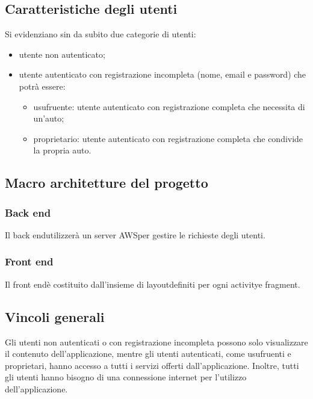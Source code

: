 \subsection{Caratteristiche degli utenti}
Si evidenziano sin da subito due categorie di utenti:
\begin{itemize}
	\item utente non autenticato;
	\item utente autenticato con registrazione incompleta (nome, email e password) che potrà essere:
		\begin{itemize}
			\item usufruente: utente autenticato con registrazione completa che necessita di un'auto;
			\item proprietario: utente autenticato con registrazione completa che condivide la propria auto.
		\end{itemize}
\end{itemize}

\subsection{Macro architetture del progetto}
\subsubsection{Back end}
Il back end\glosp utilizzerà un server AWS\glosp per gestire le richieste degli utenti.

\subsubsection{Front end}
Il front end\glosp è costituito dall'insieme di layout\glosp definiti per ogni activity\glosp e fragment\glo.

\subsection{Vincoli generali}
Gli utenti non autenticati o con registrazione incompleta possono solo visualizzare il contenuto dell'applicazione, mentre gli utenti autenticati, come usufruenti e proprietari, hanno accesso a tutti i servizi offerti dall'applicazione. Inoltre, tutti gli utenti hanno bisogno di una connessione internet per l'utilizzo dell'applicazione.

 

